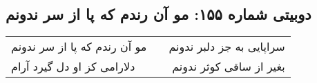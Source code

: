 \begin{center}
\section*{دوبیتی شماره ۱۵۵: مو آن رندم که پا از سر ندونم}
\label{sec:155}
\begin{longtable}{l p{0.5cm} r}
مو آن رندم که پا از سر ندونم
&&
سراپایی به جز دلبر ندونم
\\
دلارامی کز او دل گیرد آرام
&&
بغیر از ساقی کوثر ندونم
\\
\end{longtable}
\end{center}
